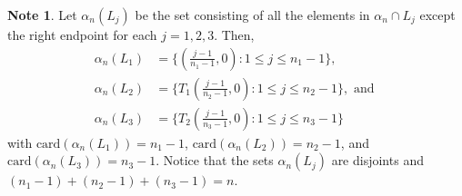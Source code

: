 \documentclass[12pt, reqno]{amsart}
\theoremstyle{plain}
\theoremstyle{definition}
\newtheorem{note}[subsection]{Note}
\newcommand{\ii}{\cap}%
\newcommand{\ga}{\alpha}
\newcommand{\te}{\text}%
\begin{document}
\begin{note} \label{note1}
Let $\ga_n(L_j)$ be the set consisting of all the elements in $\ga_n\ii L_j$ except the right endpoint for each $j=1, 2, 3$. Then, 
\begin{align*} 
\ga_n(L_1)& =\Big\{(\frac{j-1}{n_1-1}, 0) : 1\leq j\leq n_1-1\Big\},\\
\ga_n(L_2)&=\Big\{T_1(\frac{j-1}{n_2-1}, 0) : 1\leq j\leq n_2-1\Big\}, \te{ and } \\
\ga_n(L_3)&=\Big\{T_2(\frac{j-1}{n_3-1}, 0) : 1\leq j\leq n_3-1\Big\}
\end{align*}
with $\te{card}(\ga_n(L_1))=n_1-1$, $\te{card}(\ga_n(L_2))=n_2-1$, and $\te{card}(\ga_n(L_3))=n_3-1$. Notice that the sets $\ga_n(L_j)$ are disjoints and $(n_1-1)+(n_2-1)+(n_3-1)=n$. 
\end{note} 
\end{document}
